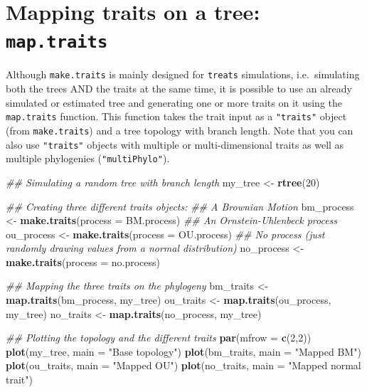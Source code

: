 \documentclass[
]{book}
\newenvironment{Shaded}{\begin{snugshade}}{\end{snugshade}}
\newcommand{\CommentTok}[1]{\textcolor[rgb]{0.56,0.35,0.01}{\textit{#1}}}
\newcommand{\DataTypeTok}[1]{\textcolor[rgb]{0.13,0.29,0.53}{#1}}
\newcommand{\DecValTok}[1]{\textcolor[rgb]{0.00,0.00,0.81}{#1}}
\newcommand{\KeywordTok}[1]{\textcolor[rgb]{0.13,0.29,0.53}{\textbf{#1}}}
\newcommand{\NormalTok}[1]{#1}
\newcommand{\StringTok}[1]{\textcolor[rgb]{0.31,0.60,0.02}{#1}}
\begin{document}
\hypertarget{map.traits}{%
\section{\texorpdfstring{Mapping traits on a tree: \texttt{map.traits}}{Mapping traits on a tree: map.traits}}\label{map.traits}}

Although \texttt{make.traits} is mainly designed for \texttt{treats} simulations, i.e.~simulating both the trees AND the traits at the same time, it is possible to use an already simulated or estimated tree and generating one or more traits on it using the \texttt{map.traits} function. This function takes the trait input as a \texttt{"traits"} object (from \texttt{make.traits}) and a tree topology with branch length. Note that you can also use \texttt{"traits"} objects with multiple or multi-dimensional traits as well as multiple phylogenies (\texttt{"multiPhylo"}).

\begin{Shaded}
\begin{Highlighting}[]
\CommentTok{\#\# Simulating a random tree with branch length}
\NormalTok{my\_tree \textless{}{-}}\StringTok{ }\KeywordTok{rtree}\NormalTok{(}\DecValTok{20}\NormalTok{)}

\CommentTok{\#\# Creating three different traits objects:}
\CommentTok{\#\# A Brownian Motion}
\NormalTok{bm\_process \textless{}{-}}\StringTok{ }\KeywordTok{make.traits}\NormalTok{(}\DataTypeTok{process =}\NormalTok{ BM.process)}
\CommentTok{\#\# An Ornstein{-}Uhlenbeck process}
\NormalTok{ou\_process \textless{}{-}}\StringTok{ }\KeywordTok{make.traits}\NormalTok{(}\DataTypeTok{process =}\NormalTok{ OU.process)}
\CommentTok{\#\# No process (just randomly drawing values from a normal distribution)}
\NormalTok{no\_process \textless{}{-}}\StringTok{ }\KeywordTok{make.traits}\NormalTok{(}\DataTypeTok{process =}\NormalTok{ no.process)}

\CommentTok{\#\# Mapping the three traits on the phylogeny}
\NormalTok{bm\_traits \textless{}{-}}\StringTok{ }\KeywordTok{map.traits}\NormalTok{(bm\_process, my\_tree)}
\NormalTok{ou\_traits \textless{}{-}}\StringTok{ }\KeywordTok{map.traits}\NormalTok{(ou\_process, my\_tree)}
\NormalTok{no\_traits \textless{}{-}}\StringTok{ }\KeywordTok{map.traits}\NormalTok{(no\_process, my\_tree)}

\CommentTok{\#\# Plotting the topology and the different traits}
\KeywordTok{par}\NormalTok{(}\DataTypeTok{mfrow =} \KeywordTok{c}\NormalTok{(}\DecValTok{2}\NormalTok{,}\DecValTok{2}\NormalTok{))}
\KeywordTok{plot}\NormalTok{(my\_tree, }\DataTypeTok{main =} \StringTok{"Base topology"}\NormalTok{)}
\KeywordTok{plot}\NormalTok{(bm\_traits, }\DataTypeTok{main =} \StringTok{"Mapped BM"}\NormalTok{)}
\KeywordTok{plot}\NormalTok{(ou\_traits, }\DataTypeTok{main =} \StringTok{"Mapped OU"}\NormalTok{)}
\KeywordTok{plot}\NormalTok{(no\_traits, }\DataTypeTok{main =} \StringTok{"Mapped normal trait"}\NormalTok{)}
\end{Highlighting}
\end{Shaded}
\end{document}
